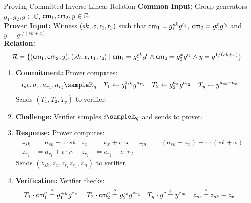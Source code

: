 \begin{protocol}{Proving Committed Inverse Linear Relation}{}\label{pok-committed-inverse-linear-relation}
\textbf{Common Input:} Group generators $g_1, g_2, g \in \mathbb{G}$, $\mathsf{cm}_1, \mathsf{cm}_2, y \in \mathbb{G}$ \\
\textbf{Prover Input:} Witness $(sk, x, \mathsf{r}_1, \mathsf{r}_2)$ such that $\mathsf{cm}_1 = g_1^{sk} g^{\mathsf{r}_1}$, $\mathsf{cm}_2 = g_2^{x}g^{\mathsf{r}_2}$ and $ y = g^{1/(sk + x)}$ \\
\textbf{Relation: }
\[
\mathcal{R} = \{(\mathsf{cm}_1,\mathsf{cm}_2, y), (sk, x, \mathsf{r}_1, \mathsf{r}_2) \mid \mathsf{cm}_1 = g_1^{sk} g^{\mathsf{r}} \wedge \mathsf{cm}_2 = g_2^{x}g^{\mathsf{r}_2} \wedge y = g^{1/(sk + x)}\}
\]
\begin{enumerate}
    \item \textbf{Commitment:} Prover computes:
    \begin{align*}
        a_{sk}, a_x, a_{r_1}, a_{r_2} &\sample \Z_q & T_1 &\gets g_1^{a_{sk}} g^{a_{r_1}} & T_2 &\gets g_2^{a_x} g^{a_{r_2}} & T_y &\gets y^{a_{sk} + a_x}
    \end{align*}
    Sends $(T_1, T_2, T_y)$ to verifier.
    
    \item \textbf{Challenge:} Verifier samples $c \sample \mathbb{Z}_q$ and sends to prover.
    
    \item \textbf{Response:} Prover computes:
     \begin{align*}
        z_{sk} &= a_{sk} + c \cdot sk & z_x &= a_x + c \cdot x &  z_m &= (a_{sk} + a_x) + c \cdot (sk + x)\\   
        z_{r_1} &= a_{r_1} + c \cdot r_1 & z_{r_2} &= a_{r_2} + c \cdot r_2
    \end{align*}
    Sends $(z_{sk}, z_x, z_{r_1} z_{r_2}, z_m)$ to verifier.
    
    \item \textbf{Verification:} Verifier checks:
    \begin{align*}
        T_1 \cdot \mathsf{cm}_1^c &\stackrel{?}{=} g_1^{z_{sk}}g^{z_{r_1}} 
        &
        T_2 \cdot \mathsf{cm}_2^c &\stackrel{?}{=}  g_2^{z_x} g^{z_{r_2}} 
        &
        T_y \cdot g^c &\stackrel{?}{=} y^{z_m} &
        z_m &\stackrel{?}{=} z_{sk} + z_x
    \end{align*}
\end{enumerate}
\end{protocol}







